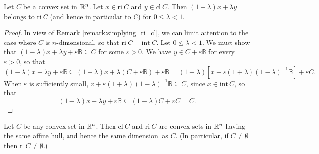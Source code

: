 \documentclass[11pt,a4paper]{article}
\begin{document}
\begin{theorem}\label{thm:rel_int_line_seg}
    Let $C$ be a convex set in $\mathbb{R}^n$. Let $x\in \mathrm{ri}\ C$ and $y\in \mathrm{cl}\ C$. Then $(1-\lambda)x+\lambda y$ belongs to $\mathrm{ri}\ C$ (and hence in particular to $C$) for $0\le \lambda <1$.
\end{theorem}

\begin{proof}
    In view of Remark \ref{remark:simplying_ri_cl}, we can limit attention to the case where $C$ is $n$-dimensional, so that $\mathrm{ri}\ C = \mathrm{int}\ C$. Let $0\le \lambda<1$. We must show that $(1-\lambda)x+\lambda y+\varepsilon \mathbb{B}\subseteq C$ for some $\varepsilon>0$. We have $y\in C+\varepsilon\mathbb{B}$ for every $\varepsilon>0$, so that 
    \begin{equation*}
        (1-\lambda)x+\lambda y+\varepsilon \mathbb{B}\subseteq (1-\lambda)x+\lambda (C+\varepsilon\mathbb{B})+\varepsilon \mathbb{B} = (1-\lambda)[x +\varepsilon(1+\lambda)(1-\lambda)^{-1}\mathbb{B}]+\varepsilon C.
    \end{equation*}
    When $\varepsilon$ is sufficiently small, $x +\varepsilon(1+\lambda)(1-\lambda)^{-1}\mathbb{B}\subseteq C$, since $x\in\mathrm{int}\ C$, so that 
    \begin{equation*}
        (1-\lambda)x+\lambda y+\varepsilon \mathbb{B}\subseteq (1-\lambda)C+\varepsilon C = C.
    \end{equation*}
\end{proof}

\begin{theorem}\label{thm:convexity_of_ri_cl}
    Let $C$ be any convex set in $\mathbb{R}^n$. Then $\mathrm{cl}\ C$ and $\mathrm{ri}\ C$ are convex sets in $\mathbb{R}^n$ having the same affine hull, and hence the same dimension, as $C$. (In particular, if $C\neq \emptyset$ then $\mathrm{ri}\ C \neq \emptyset$.)
\end{theorem}
\end{document}
